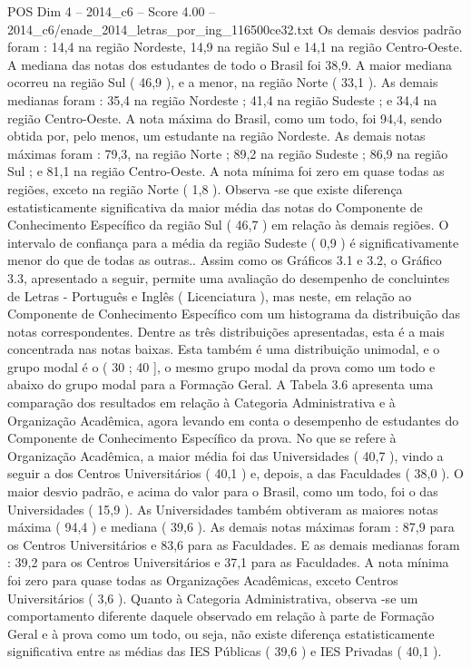 \begin{textsample}{POS Dim 4 – 2014\_c6 – Score 4.00 – 2014\_c6/enade\_2014\_letras\_por\_ing\_116500ce32.txt}
Os demais desvios padrão foram : 14,4 na região Nordeste, 14,9 na região Sul e 14,1 na região Centro-Oeste.
A mediana das notas dos estudantes de todo o Brasil foi 38,9.
A maior mediana ocorreu na região Sul ( 46,9 ), e a menor, na região Norte ( 33,1 ).
As demais medianas foram : 35,4 na região Nordeste ; 41,4 na região Sudeste ; e 34,4 na região Centro-Oeste.
A nota máxima do Brasil, como um todo, foi 94,4, sendo obtida por, pelo menos, um estudante na região Nordeste.
As demais notas máximas foram : 79,3, na região Norte ; 89,2 na região Sudeste ; 86,9 na região Sul ; e 81,1 na região Centro-Oeste.
A nota mínima foi zero em quase todas as regiões, exceto na região Norte ( 1,8 ).
Observa -se que existe diferença estatisticamente significativa da maior média das notas do Componente de Conhecimento Específico da região Sul ( 46,7 ) em relação às demais regiões.
O intervalo de confiança para a média da região Sudeste ( 0,9 ) é significativamente menor do que de todas as outras..
Assim como os Gráficos 3.1 e 3.2, o Gráfico 3.3, apresentado a seguir, permite uma avaliação do desempenho de concluintes de Letras - Português e Inglês ( Licenciatura ), mas neste, em relação ao Componente de Conhecimento Específico com um histograma da distribuição das notas correspondentes.
Dentre as três distribuições apresentadas, esta é a mais concentrada nas notas baixas.
Esta também é uma distribuição unimodal, e o grupo modal é o ( 30 ; 40 ], o mesmo grupo modal da prova como um todo e abaixo do grupo modal para a Formação Geral.
A Tabela 3.6 apresenta uma comparação dos resultados em relação à Categoria Administrativa e à Organização Acadêmica, agora levando em conta o desempenho de estudantes do Componente de Conhecimento Específico da prova.
No que se refere à Organização Acadêmica, a maior média foi das Universidades ( 40,7 ), vindo a seguir a dos Centros Universitários ( 40,1 ) e, depois, a das Faculdades ( 38,0 ).
O maior desvio padrão, e acima do valor para o Brasil, como um todo, foi o das Universidades ( 15,9 ).
As Universidades também obtiveram as maiores notas máxima ( 94,4 ) e mediana ( 39,6 ).
As demais notas máximas foram : 87,9 para os Centros Universitários e 83,6 para as Faculdades.
E as demais medianas foram : 39,2 para os Centros Universitários e 37,1 para as Faculdades.
A nota mínima foi zero para quase todas as Organizações Acadêmicas, exceto Centros Universitários ( 3,6 ).
Quanto à Categoria Administrativa, observa -se um comportamento diferente daquele observado em relação à parte de Formação Geral e à prova como um todo, ou seja, não existe diferença estatisticamente significativa entre as médias das IES Públicas ( 39,6 ) e IES Privadas ( 40,1 ).

\end{textsample}
